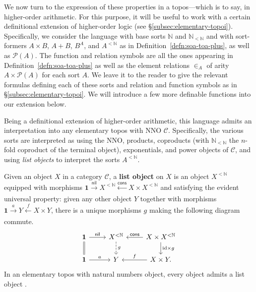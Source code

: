 \documentclass[11pt]{amsart}
\newcommand\cC{\mathcal{C}}
\newcommand\cons{\mathsf{cons}}
\newcommand\defword[1]{\textbf{#1}}
\newcommand\id{\mathrm{id}}
\newcommand{\N}{\mathbb{N}}
\newcommand\nil{\mathsf{nil}}
\newcommand\pow{\mathcal{P}}
\newcommand\tm{\mathbf{1}}
\newcommand\tox[2][]{\xrightarrow[#1]{#2}}
\newcommand\xot[2][]{\xleftarrow[#1]{#2}}
\theoremstyle{definition}
\theoremstyle{remark}
\theoremstyle{plain}
\begin{document}
We now turn to the expression of these properties in a topos---which is to say, in higher-order arithmetic.
For this purpose, it will be useful to work with a certain definitional extension of higher-order logic (see \S\ref{subsec:elementary-topoi}).
Specifically, we consider the language with base sorts \( \N \) and \( \N_{<\N} \) and with sort-formers \( A \times B \), \( A + B \), \( B^A \), and \( A^{<\N} \) as in Definition~\ref{defn:soa-toa-plus}, as well as \( \pow(A) \).
The function and relation symbols are all the ones appearing in Definition~\ref{defn:soa-toa-plus} as well as the element relations \( \in_A \) of arity \( A \times \pow(A) \) for each sort \( A \).
We leave it to the reader to give the relevant formulas defining each of these sorts and relation and function symbols as in \S\ref{subsec:elementary-topoi}.
We will introduce a few more definable functions into our extension below.

Being a definitional extension of higher-order arithmetic, this language admits an interpretation into any elementary topos with NNO \( \cC \).
Specifically, the various sorts are interpreted as using the NNO, products, coproducts (with \( \N_{<\N} \) the \( n \)-fold coproduct of the terminal object), exponentials, and power objects of \( \cC \), and using \emph{list objects} to interpret the sorts \( A^{<\N} \).

Given an object \( X \) in a category \( \cC \), a \defword{list object} on \( X \) is an object \( X^{<\N} \) equipped with morphisms \( \tm \tox{\nil} X^{<\N} \xot{\cons} X \times X^{<\N} \) and satisfying the evident universal property: given any other object \( Y \) together with morphisms \( \tm \tox{a} Y \xot{f} X \times Y \), there is a unique morphisms \( g \) making the following diagram commute.
  \[
    \begin{tikzcd}
      \tm \ar[d, equals] \ar[r, "\nil"] & X^{<\N} \ar[d, "g", dashed] & X \times X^{<\N} \ar[d, "\id \times g"] \ar[l, "\cons"'] \\
      \tm \ar[r, "a"] & Y & X \times Y. \ar[l, "f"']
    \end{tikzcd}
  \]
  In an elementary topos with natural numbers object, every object admits a list object \cite[Theorem~A2.5.17]{johnstone-elephant-vols}.
\end{document}
